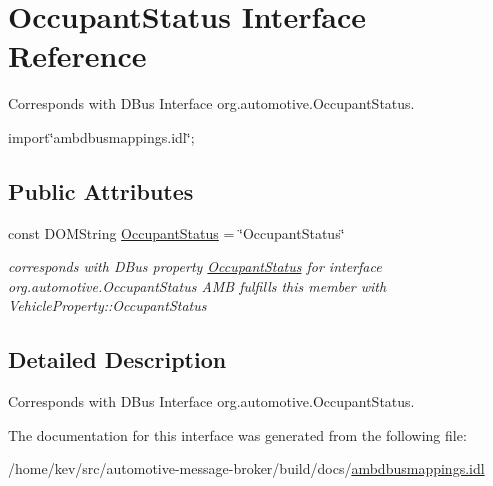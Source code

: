 \hypertarget{interfaceOccupantStatus}{\section{Occupant\+Status Interface Reference}
\label{interfaceOccupantStatus}
}


Corresponds with D\+Bus Interface org.\+automotive.\+Occupant\+Status.  




{\ttfamily import\char`\"{}ambdbusmappings.\+idl\char`\"{};}

\subsection*{Public Attributes}
\begin{DoxyCompactItemize}
\item 
\hypertarget{interfaceOccupantStatus_acfe99b178c11dc9cdc91511914914200}{const D\+O\+M\+String \hyperlink{interfaceOccupantStatus_acfe99b178c11dc9cdc91511914914200}{Occupant\+Status} = \char`\"{}Occupant\+Status\char`\"{}}\label{interfaceOccupantStatus_acfe99b178c11dc9cdc91511914914200}

\begin{DoxyCompactList}\small\item\em corresponds with D\+Bus property \hyperlink{interfaceOccupantStatus}{Occupant\+Status} for interface org.\+automotive.\+Occupant\+Status A\+M\+B fulfills this member with Vehicle\+Property\+::\+Occupant\+Status \end{DoxyCompactList}\end{DoxyCompactItemize}


\subsection{Detailed Description}
Corresponds with D\+Bus Interface org.\+automotive.\+Occupant\+Status. 

The documentation for this interface was generated from the following file\+:\begin{DoxyCompactItemize}
\item 
/home/kev/src/automotive-\/message-\/broker/build/docs/\hyperlink{ambdbusmappings_8idl}{ambdbusmappings.\+idl}\end{DoxyCompactItemize}
